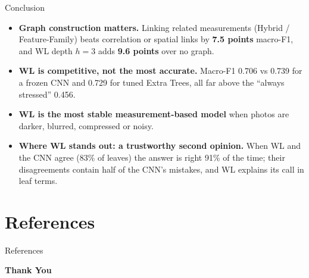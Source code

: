 \documentclass[aspectratio=169, 11pt]{beamer}
\begin{document}
\begin{frame}{Conclusion}
    \begin{itemize}
        \setlength{\itemsep}{0.25cm}
        \item \textbf{Graph construction matters.} Linking related measurements (Hybrid / Feature-Family) beats correlation or spatial links by \textbf{7.5 points} macro-F1, and WL depth $h{=}3$ adds \textbf{9.6 points} over no graph.
        \item \textbf{WL is competitive, not the most accurate.} Macro-F1 0.706 vs 0.739 for a frozen CNN and 0.729 for tuned Extra Trees, all far above the ``always stressed'' 0.456.
        \item \textbf{WL is the most stable measurement-based model} when photos are darker, blurred, compressed or noisy.
        \item \textbf{Where WL stands out: a trustworthy second opinion.} When WL and the CNN agree (83\% of leaves) the answer is right 91\% of the time; their disagreements contain half of the CNN's mistakes, and WL explains its call in leaf terms.
    \end{itemize}

    \vspace{0.2cm}
    \centering
\end{frame}

\section{References}
\begin{frame}[allowframebreaks]{References}
    \tiny
    
    
\end{frame}

\begin{frame}
    \centering
    \vspace{1.5cm}
    {\Huge \textbf{\textcolor{amritaMaroon}{Thank You}}} \\[0.8cm]
\end{frame}
\end{document}
